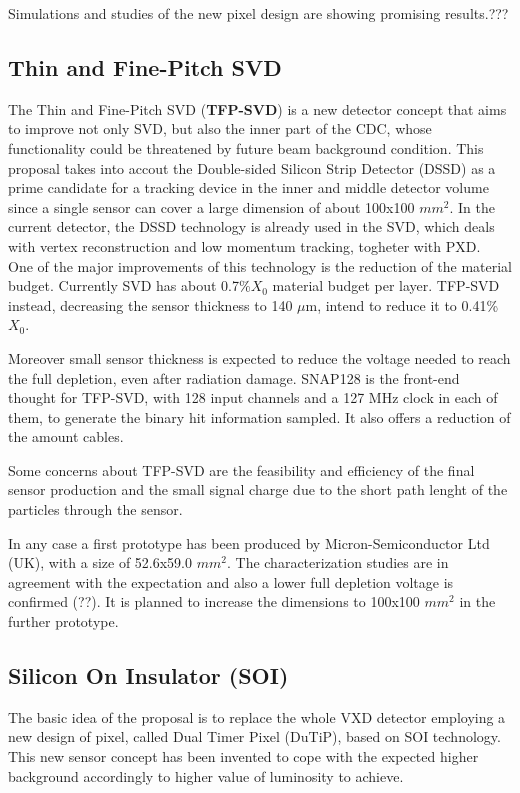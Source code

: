 Simulations and studies of the new pixel design are showing promising results.???


\subsection{Thin and Fine-Pitch SVD}

The Thin and Fine-Pitch SVD (\textbf{TFP-SVD}) is a new detector concept that aims to improve not only SVD, but also the inner part of the CDC, whose functionality could be threatened by future beam background condition.
This proposal takes into accout the Double-sided Silicon Strip Detector (DSSD) as a prime candidate for a tracking device in the inner and middle detector volume since a single sensor can cover a large dimension of about 100x100 $mm^{2}$. In the current detector, the DSSD technology is already used in the SVD, which deals with vertex reconstruction and low momentum tracking, togheter with PXD.\\

One of the major improvements of this technology is the reduction of the material budget.
Currently SVD has about 0.7\%$X_{0}$ material budget per layer. TFP-SVD instead, decreasing the sensor thickness to 140 $\mu$m, intend to reduce it to 0.41\%$X_{0}$. 

Moreover small sensor thickness is expected to reduce the voltage needed to reach the full depletion, even after radiation damage. 
SNAP128 is the front-end thought for TFP-SVD, with 128 input channels and a 127 MHz clock in each of them, to generate the binary hit information sampled. It also offers a reduction of the amount cables.

Some concerns about TFP-SVD are the feasibility and efficiency of the final sensor production and the small signal charge due to the short path lenght of the particles through the sensor.

In any case a first prototype has been produced by Micron-Semiconductor Ltd (UK), with a size of 52.6x59.0 $mm^{2}$. The characterization studies are in agreement with the expectation and also a lower full depletion voltage is confirmed (??). It is planned to increase the dimensions to 100x100 $mm^{2}$ in the further prototype.


\subsection{Silicon On Insulator (SOI)}

The basic idea of the proposal is to replace the whole VXD detector employing a new design of pixel, called Dual Timer Pixel (DuTiP), based on SOI technology. This new sensor concept has been invented to cope with the expected higher background accordingly to higher value of luminosity to achieve.

